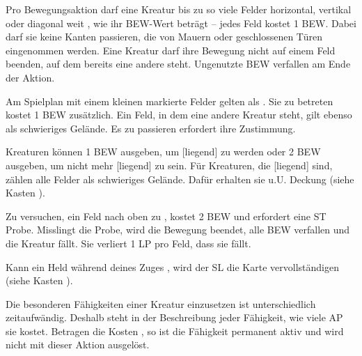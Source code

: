 {			


			Pro Bewegungsaktion darf eine Kreatur bis zu so viele Felder horizontal, vertikal oder diagonal weit , wie ihr BEW-Wert beträgt -- jedes Feld kostet 1 BEW. Dabei darf sie keine Kanten passieren, die von Mauern oder geschlossenen Türen eingenommen werden. Eine Kreatur darf ihre Bewegung nicht auf einem Feld beenden, auf dem bereits eine andere steht. Ungenutzte BEW verfallen am Ende der Aktion.

			Am Spielplan mit einem kleinen  markierte Felder gelten als . Sie zu betreten kostet 1 BEW zusätzlich. Ein Feld, in dem eine andere Kreatur steht, gilt ebenso als schwieriges Gelände. Es zu passieren erfordert ihre Zustimmung.

			Kreaturen können 1 BEW ausgeben, um [liegend] zu werden oder 2 BEW ausgeben, um nicht mehr [liegend] zu sein. Für Kreaturen, die [liegend] sind, zählen alle Felder als schwieriges Gelände. Dafür erhalten sie u.U. Deckung (siehe Kasten ).

			Zu versuchen, ein Feld nach oben zu , kostet 2 BEW und erfordert eine ST Probe. Misslingt die Probe, wird die Bewegung beendet, alle BEW verfallen und die Kreatur fällt. Sie verliert 1 LP pro Feld, dass sie fällt.

			Kann ein Held während deines Zuges , wird der SL die Karte vervollständigen (siehe Kasten ).

			Die besonderen Fähigkeiten einer Kreatur einzusetzen ist unterschiedlich zeitaufwändig. Deshalb steht in der Beschreibung jeder Fähigkeit, wie viele AP sie kostet. Betragen die Kosten , so ist die Fähigkeit permanent aktiv und wird nicht mit dieser Aktion ausgelöst.

}

